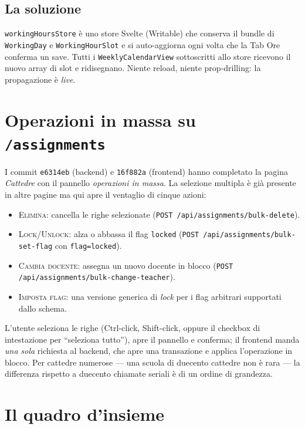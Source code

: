 \subsection{La soluzione}

\texttt{workingHoursStore} \`e uno store Svelte (Writable) che
conserva il bundle di \texttt{WorkingDay} e \texttt{WorkingHourSlot}
e si auto-aggiorna ogni volta che la Tab Ore conferma un save.
Tutti i \texttt{WeeklyCalendarView} sottoscritti allo store
ricevono il nuovo array di slot e ridisegnano. Niente reload,
niente prop-drilling: la propagazione \`e \emph{live}.

\section{Operazioni in massa su \texttt{/assignments}}
\label{sec:bulk-assignments}

I commit \texttt{e6314eb} (backend) e \texttt{16f882a} (frontend)
hanno completato la pagina \emph{Cattedre} con il pannello
\emph{operazioni in massa}. La selezione multipla \`e gi\`a presente
in altre pagine ma qui apre il ventaglio di cinque azioni:

\begin{itemize}
  \item \textsc{Elimina}: cancella le righe selezionate
    (\texttt{POST /api/assignments/bulk-delete}).
  \item \textsc{Lock}/\textsc{Unlock}: alza o abbassa il flag
    \texttt{locked} (\texttt{POST /api/assignments/bulk-set-flag}
    con \texttt{flag=locked}).
  \item \textsc{Cambia docente}: assegna un nuovo docente in
    blocco (\texttt{POST /api/assignments/bulk-change-teacher}).
  \item \textsc{Imposta flag}: una versione generica di
    \emph{lock} per i flag arbitrari supportati dallo schema.
\end{itemize}

L'utente seleziona le righe (Ctrl-click, Shift-click, oppure il
checkbox di intestazione per ``seleziona tutto''), apre il
pannello e conferma; il frontend manda \emph{una sola} richiesta
al backend, che apre una transazione e applica l'operazione in
blocco. Per cattedre numerose --- una scuola di duecento
cattedre non \`e rara --- la differenza rispetto a duecento
chiamate seriali \`e di un ordine di grandezza.

\section{Il quadro d'insieme}

